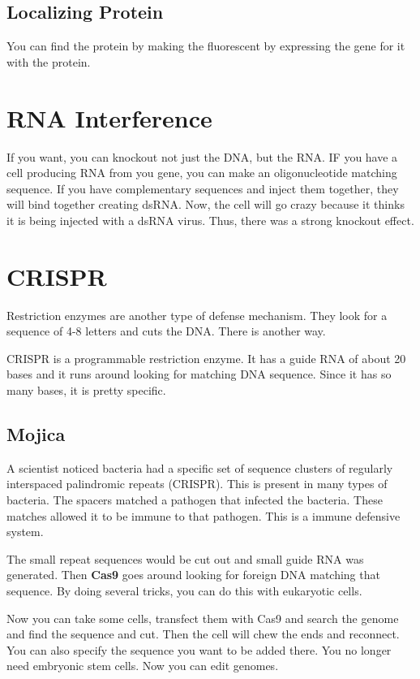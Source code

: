 \documentclass{article}
\begin{document}
\subsection{Localizing Protein}

You can find the protein by making the fluorescent by expressing the gene for it
with the protein.

\section{RNA Interference}

If you want, you can knockout not just the DNA, but the RNA. IF you have a cell
producing RNA from you gene, you can make an oligonucleotide matching sequence.
If you have complementary sequences and inject them together, they will bind
together creating dsRNA. Now, the cell will go crazy because it thinks it is
being injected with a dsRNA virus. Thus, there was a strong knockout effect.

\section{CRISPR}

Restriction enzymes are another type of defense mechanism. They look for a
sequence of 4-8 letters and cuts the DNA. There is another way.

CRISPR is a programmable restriction enzyme. It has a guide RNA of about 20
bases and it runs around looking for matching DNA sequence. Since it has so many
bases, it is pretty specific.

\subsection{Mojica}

A scientist noticed bacteria had a specific set of sequence clusters of
regularly interspaced palindromic repeats (CRISPR). This is present in many
types of bacteria. The spacers matched a pathogen that infected the bacteria.
These matches allowed it to be immune to that pathogen. This is a immune
defensive system.

The small repeat sequences would be cut out and small guide RNA was generated.
Then \textbf{Cas9} goes around looking for foreign DNA matching that sequence.
By doing several tricks, you can do this with eukaryotic cells.

Now you can take some cells, transfect them with Cas9 and search the genome and
find the sequence and cut. Then the cell will chew the ends and reconnect. You
can also specify the sequence you want to be added there. You no longer need
embryonic stem cells. Now you can edit genomes.
\end{document}
